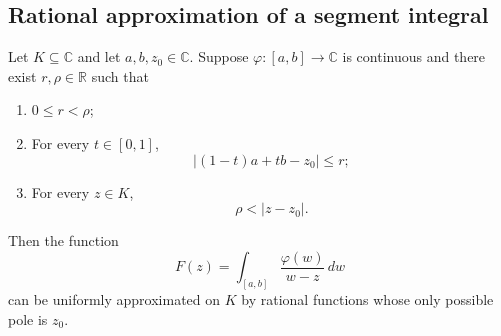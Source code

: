 \documentclass[11pt]{article}
\begin{document}
\subsection{Rational approximation of a segment integral}
Let $K \subseteq \mathbb{C}$ and let $a,b,z_0\in\mathbb{C}$.
Suppose $\varphi:[a,b]\to\mathbb{C}$ is continuous and
there exist $r,\rho\in\mathbb{R}$ such that
\begin{enumerate}
    \item $0\leq r<\rho$;
    \item For every $t\in[0,1]$,
    \[
        |(1-t)a+tb-z_0|\leq r;
    \]
    \item For every $z\in K$,
    \[
        \rho<|z-z_0|.
    \]
\end{enumerate}
Then the function
\[
    F(z)=\int_{[a,b]}\frac{\varphi(w)}{w-z}\,dw
\]
can be uniformly approximated on $K$ by rational functions
whose only possible pole is $z_0$.
\end{document}
